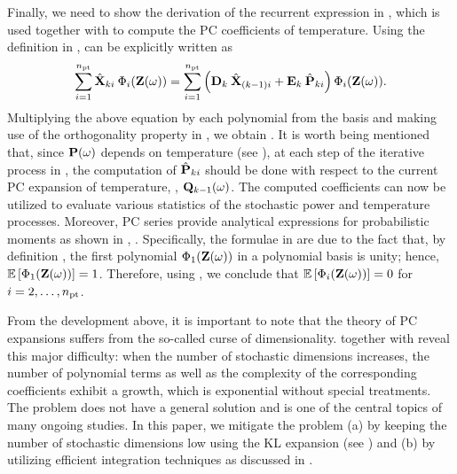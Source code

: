 Finally, we need to show the derivation of the recurrent expression in , which is used together with  to compute the PC coefficients of temperature. Using the definition in ,  can be explicitly written as
\[
  \sum_{i = 1}^{\pcterms} \pcc{\vX}_{ki} \: \pcb_i(\vZ(\o)) = \sum_{i = 1}^{\pcterms} \left( \mCF_k \: \pcc{\vX}_{(k - 1)i} + \mCS_k \: \pcc{\vP}_{ki} \right) \pcb_i(\vZ(\o)).
\]
Multiplying the above equation by each polynomial from the basis and making use of the orthogonality property in , we obtain . It is worth being mentioned that, since $\mathbf{P}(\omega)$ depends on temperature (see ), at each step of the iterative process in , the computation of $\hat{\mathbf{P}}_{ki}$ should be done with respect to the current PC expansion of temperature, \ie, $\mathbf{Q}_{k - 1}(\omega)$. The computed coefficients can now be utilized to evaluate various statistics of the stochastic power and temperature processes. Moreover, PC series provide analytical expressions for probabilistic moments as shown in , . Specifically, the formulae in  are due to the fact that, by definition \cite{xiu2010}, the first polynomial $\Phi_1(\mathbf{Z}(\omega))$ in a polynomial basis is unity; hence, $\mathbb{E}\left[\Phi_1(\mathbf{Z}(\omega))\right] = 1$. Therefore, using , we conclude that $\mathbb{E}\left[\Phi_i(\mathbf{Z}(\omega))\right] = 0$ for $i = 2, \dotsc, {n_\text{pt}}$.

From the development above, it is important to note that the theory of PC expansions suffers from the so-called curse of dimensionality.  together with  reveal this major difficulty: when the number of stochastic dimensions increases, the number of polynomial terms as well as the complexity of the corresponding coefficients exhibit a growth, which is exponential without special treatments. The problem does not have a general solution and is one of the central topics of many ongoing studies. In this paper, we mitigate the problem (a) by keeping the number of stochastic dimensions low using the KL expansion (see ) and (b) by utilizing efficient integration techniques as discussed in .

